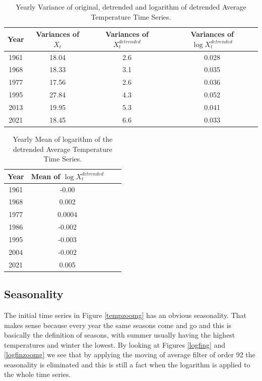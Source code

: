 \documentclass[conference]{IEEEtran}
\begin{document}
\begin{table}
\begin{center}
\begin{tabular}{||c||c||c||c||} 
 \hline 
 Year & Variances of $X_t$ & \makecell{Variances of\\$X_t^{detrended}$} & \makecell{Variances of\\$\log X_t^{detrended}$} \\ [0.5ex] 
 \hline\hline
 1961 & 18.04 & 2.6 & 0.028\\ 
 \hline
 1968 & 18.33 & 3.1 & 0.035\\
 \hline
 1977 & 17.56 & 2.6 & 0.036\\
 \hline
 1995 & 27.84 & 4.3 & 0.052\\
 \hline
 2013 & 19.95 & 5.3 & 0.041\\
 \hline
 2021 & 18.45 & 6.6 & 0.033\\
 \hline
\end{tabular}
\end{center}
\caption{Yearly Variance of original, detrended and logarithm \break of detrended Average Temperature Time Series.}
\label{tablevg}
\end{table}

\begin{table}
\begin{center}
\begin{tabular}{||c||c||c||c||} 
 \hline 
 Year & \makecell{Mean of\\$\log X_t^{detrended}$} \\ [0.5ex]
 \hline\hline
 1961 & -0.00\\ 
 \hline
 1968 & 0.002\\
 \hline
 1977 & 0.0004\\
 \hline
 1986 & -0.002\\
 \hline
 1995 & -0.003\\
 \hline
 2004 & -0.002\\
 \hline
 2021 & 0.005\\
 \hline
\end{tabular}
\end{center}
\caption{Yearly Mean of logarithm of the detrended \break Average Temperature Time Series.}
\label{table1mg}
\end{table}

\subsection{Seasonality}

The initial time series in Figure \ref{tempzoomg} has an obvious seasonality. That makes sense because every year 
the same seasons come and go and this is basically the definition of seasons, with summer usually having the highest temperatures and winter the lowest. By looking at Figures \ref{logfing} and \ref{logfinzoomg} we see that by applying the moving of average filter of order 92 the seasonality is eliminated and this is still a fact when the logarithm is applied to the whole time series.
\end{document}
